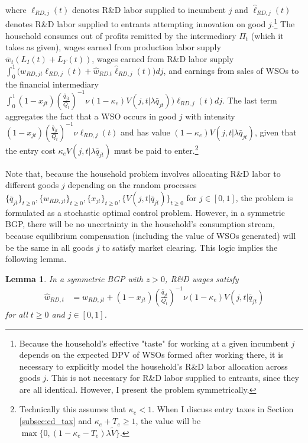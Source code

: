 \documentclass[11pt,english]{article}
\newtheorem{lemma}{Lemma}
\begin{document}
where $\ell_{RD,j}(t)$ denotes R\&D labor supplied to incumbent $j$ and $\hat{\ell}_{RD,j}(t)$ denotes R\&D labor supplied to entrants attempting innovation on good $j$.\footnote{Because the household's effective "taste" for working at a given incumbent $j$ depends on the expected DPV of WSOs formed after working there, it is necessary to explicitly model the household's R\&D labor allocation across goods $j$. This is not necessary for R\&D labor supplied to entrants, since they are all identical. However, I present the problem symmetrically.} The household consumes out of profits remitted by the intermediary $\Pi_t$ (which it takes as given), wages earned from production labor supply $\bar{w}_t (L_I(t) + L_F(t))$, wages earned from R\&D labor supply $\int_0^1 \big(w_{RD,jt} \ell_{RD,j}(t) + \hat{w}_{RD.t} \hat{\ell}_{RD,j}(t) \big) dj$, and earnings from sales of WSOs to the financial intermediary $ \int_0^1 (1-x_{jt}) (\frac{\bar{q}_{jt}}{Q_t})^{-1} \nu (1-\kappa_e) V(j,t|\lambda \bar{q}_{jt}) \big)\ell_{RD,j}(t) dj$. The last term aggregates the fact that a WSO occurs in good $j$ with intensity $(1-x_{jt}) (\frac{\bar{q}_{jt}}{Q_t})^{-1} \nu \ell_{RD,j}(t)$ and has value $(1-\kappa_e) V(j,t|\lambda \bar{q}_{jt})$, given that the entry cost $\kappa_e V(j,t|\lambda \bar{q}_{jt})$ must be paid to enter.\footnote{Technically this assumes that $\kappa_e < 1$. When I discuss entry taxes in Section \ref{subsec:cd_tax} and $\kappa_e + T_e \ge 1$, the value will be $\max\{0,(1-\kappa_e - T_e) \lambda \tilde{V} \}$.} 

Note that, because the household problem involves allocating R\&D labor to different goods $j$ depending on the random processes $\{\bar{q}_{jt}\}_{t \ge 0}, \{w_{RD,jt}\}_{t\ge 0}, \{x_{jt}\}_{t\ge 0}, \{V(j,t|\bar{q}_{jt})\}_{t\ge 0}$ for $j \in [0,1]$, the problem is formulated as a stochastic optimal control problem. However, in a symmetric BGP, there will be no uncertainty in the household's consumption stream, because equilibrium compensation (including the value of WSOs generated) will be the same in all goods $j$ to satisfy market clearing. This logic implies the following lemma.

\begin{lemma}\label{lemma:RD_worker_indifference}
	In a symmetric BGP with $z > 0$, R\&D wages satisfy
	\begin{align}
	\hat{w}_{RD,t} &= w_{RD,jt} + (1-x_{jt}) (\frac{\bar{q}_{jt}}{Q_t})^{-1} \nu (1-\kappa_e) V(j,t|\bar{q}_{jt}) \label{eq:RD_worker_indifference}
	\end{align}
	for all $t \ge 0$ and $j \in [0,1]$.
\end{lemma}
\end{document}

